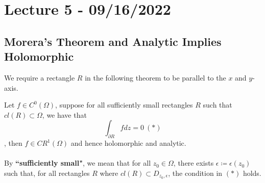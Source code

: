 \section{Lecture 5 - 09/16/2022}

\subsection{Morera's Theorem and Analytic Implies Holomorphic}

\noindent We require a rectangle $R$ in the following theorem to be parallel to the $x$ and $y$-axis.

\begin{theorem}
    Let $f \in C^0(\Omega)$, suppose for all sufficiently small rectangles $R$ such that $cl(R) \subset \Omega$, we have that
    \[\int_{\partial R} f dz = 0\ (*)\]
    , then $f \in CR^1(\Omega)$ and hence holomorphic and analytic.\\\\
    By \textbf{``sufficiently small"}, we mean that for all $z_0 \in \Omega$, there exists $\epsilon \coloneqq \epsilon(z_0)$ such that, for all rectangles $R$ where $cl(R) \subset D_{z_0, \epsilon}$, the condition in $(*)$ holds.
\end{theorem}

